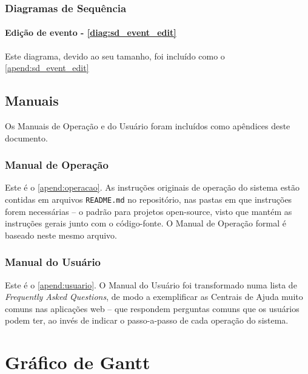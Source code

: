 \documentclass[12pt,a4paper,twoside,hyphens,english,brazil]{abntex2}
\begin{document}
{\subsection{Diagramas de Sequência}
\subsubsection*{Edição de evento - \autoref{diag:sd_event_edit}}
Este diagrama, devido ao seu tamanho, foi incluído como o \autoref{apend:sd_event_edit}



\section{Manuais}
Os Manuais de Operação e do Usuário foram incluídos como apêndices deste documento.

\subsection{Manual de Operação}
Este é o \autoref{apend:operacao}. As instruções originais de operação do sistema estão contidas em arquivos \texttt{README.md} no repositório, nas pastas em que instruções forem necessárias -- o padrão para projetos open-source, visto que mantém as instruções gerais junto com o código-fonte. O Manual de Operação formal é baseado neste mesmo arquivo.

\subsection{Manual do Usuário}
Este é o \autoref{apend:usuario}. O Manual do Usuário foi transformado numa lista de \emph{Frequently Asked Questions}, de modo a exemplificar as Centrais de Ajuda muito comuns nas aplicações web -- que respondem perguntas comuns que os usuários podem ter, ao invés de indicar o passo-a-passo de cada operação do sistema.

\postextual

\apendices

\chapter{Gráfico de Gantt} \label{apend:gantt}


}
\end{document}

